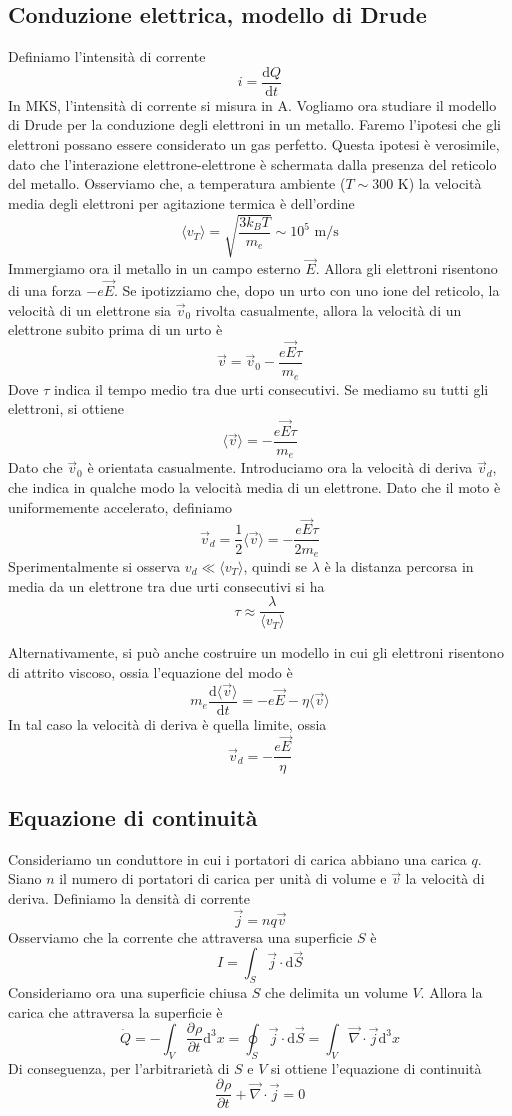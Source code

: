 \documentclass[a4paper,11pt]{book}
\let\oldnabla\nabla
\renewcommand{\nabla}{\vec{\oldnabla}}
\newcommand{\der}[3][]{\frac{\partial ^{#1}#2}{\partial #3^{#1}}}
\newcommand{\dif}{\mathrm{d}}
\theoremstyle{definition}
\theoremstyle{theorem}
\begin{document}
\subsection{Conduzione elettrica, modello di Drude}
	Definiamo l'intensità di corrente
	\[i=\frac{\dif Q}{\dif t}\]
	In MKS, l'intensità di corrente si misura in A. Vogliamo ora studiare il modello di Drude per la conduzione degli elettroni in un metallo. Faremo l'ipotesi che gli elettroni possano essere considerato un gas perfetto. Questa ipotesi è verosimile, dato che l'interazione elettrone-elettrone è schermata dalla presenza del reticolo del metallo. Osserviamo che, a temperatura ambiente ($T\sim 300$ K) la velocità media degli elettroni per agitazione termica è dell'ordine
	\[\langle v_T\rangle=\sqrt{\frac{3k_BT}{m_e}}\sim 10^5\textrm{ m/s}\]
	Immergiamo ora il metallo in un campo esterno $\vec{E}$. Allora gli elettroni risentono di una forza $-e\vec{E}$. Se ipotizziamo che, dopo un urto con uno ione del reticolo, la velocità di un elettrone sia $\vec{v}_0$ rivolta casualmente, allora la velocità di un elettrone subito prima di un urto è
	\[\vec{v}=\vec{v}_0-\frac{e\vec{E}\tau}{m_e}\]
	Dove $\tau$ indica il tempo medio tra due urti consecutivi. Se mediamo su tutti gli elettroni, si ottiene
	\[\langle\vec{v}\rangle=-\frac{e\vec{E}\tau}{m_e}\]
	Dato che $\vec{v}_0$ è orientata casualmente. Introduciamo ora la velocità di deriva $\vec{v}_d$, che indica in qualche modo la velocità media di un elettrone. Dato che il moto è uniformemente accelerato, definiamo
	\[\vec{v}_d=\frac{1}{2}\langle\vec{v}\rangle=-\frac{e\vec{E}\tau}{2m_e}\]
	Sperimentalmente si osserva $v_d\ll \langle v_T\rangle$, quindi se $\lambda$ è la distanza percorsa in media da un elettrone tra due urti consecutivi si ha
	\[\tau\approx\frac{\lambda}{\langle v_T\rangle}\]
	
	Alternativamente, si può anche costruire un modello in cui gli elettroni risentono di attrito viscoso, ossia l'equazione del modo è
	\[m_e\frac{\dif\langle\vec{v}\rangle}{\dif t}=-e\vec{E}-\eta\langle\vec{v}\rangle\]
	In tal caso la velocità di deriva è quella limite, ossia
	\[\vec{v}_d=-\frac{e\vec{E}}{\eta}\]
\subsection{Equazione di continuità}
Consideriamo un conduttore in cui i portatori di carica abbiano una carica $q$. Siano $n$ il numero di portatori di carica per unità di volume e $\vec{v}$ la velocità di deriva. Definiamo la densità di corrente
\[\vec{j}=nq\vec{v}\]
Osserviamo che la corrente che attraversa una superficie $S$ è 
\[I=\int_S\vec{j}\cdot\dif\vec{S}\]
Consideriamo ora una superficie chiusa $S$ che delimita un volume $V$. Allora la carica che attraversa la superficie è
\[\dot{Q}=-\int_{V}\der{\rho}{t}\dif^3x=\oint_S\vec{j}\cdot\dif\vec{S}=\int_V\nabla\cdot\vec{j}\dif^3x\]
Di conseguenza, per l'arbitrarietà di $S$ e $V$ si ottiene l'equazione di continuità
\[\der{\rho}{t}+\nabla\cdot\vec{j}=0\]
\end{document}
